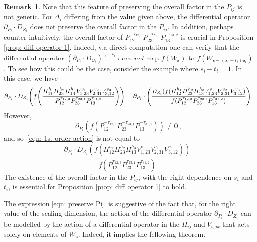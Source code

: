 \documentclass[12pt,a4paper]{extarticle}
\theoremstyle{definition}
\newtheorem{remark}[theorem]{Remark}
\begin{document}
\begin{remark}
Note that this feature of preserving the overall factor in the $P_{ij}$ is not generic. For $\Delta_i$ differing from the value given above, the differential operator $\partial_{P_i}\cdot D_{Z_i}$
does not preserve the overall factor in the $P_{ij}$. In addition, perhaps counter-intuitively, the overall factor of $P^{-\tau_{12,3}}_{12}P^{-\tau_{23,1}}_{23}P^{-\tau_{31,2}}_{13}$ is crucial in Proposition \ref{prop: diff operator 1}. Indeed, via direct computation one can verify that the differential operator $(\partial_{P_i}\cdot D_{Z_i})^{s_i-t_i}$ does \emph{not} map $f(W_{\mathbf{s}})$ to $f(W_{\mathbf{s}-(s_i-t_i)\mathbf{e}_i})$. To see how this could be the case, consider the example where $s_i-t_i=1$. In this case, we have
\begin{equation}\label{eqn: 1st order action}
    {\small\partial_{P_i}\cdot D_{Z_i}\Bigg(f\Bigg(\frac{H^{h_{1}}_{12}H^{h_{2}}_{23}H^{h_{3}}_{13}V^{v_1}_{1,23}V^{v_2}_{2,31}V^{v_3}_{3,12}}{P^{\tau_{12,3}}_{12}P^{\tau_{23,1}}_{23}P^{\tau_{31,2}}_{13}}\Bigg)\Bigg)=\partial_{P_i}\cdot\Bigg(\frac{D_{Z_i}(f(H^{h_{1}}_{12}H^{h_{2}}_{23}H^{h_{3}}_{13}V^{v_1}_{1,23}V^{v_2}_{2,31}V^{v_3}_{3,12})}{f(P^{\tau_{12,3}}_{12}P^{\tau_{23,1}}_{23}P^{\tau_{31,2}}_{13})}\Bigg).}
\end{equation}
However,
\begin{equation*}
    \partial_{P_i}(f(P^{-\tau_{12,3}}_{12}P^{-\tau_{23,1}}_{23}P^{-\tau_{31,2}}_{13}))\neq \mathbf{0}\,,
\end{equation*}
and so~\eqref{eqn: 1st order action} is not equal to
\begin{equation*}
    \frac{\partial_{P_i}\cdot D_{Z_i}(f(H^{h_{1}}_{12}H^{h_{2}}_{23}H^{h_{3}}_{13}V^{v_1}_{1,23}V^{v_2}_{2,31}V^{v_3}_{3,12}))}{f(P^{\tau_{12,3}}_{12}P^{\tau_{23,1}}_{23}P^{\tau_{31,2}}_{13})}\,.
\end{equation*}
The existence of the overall factor in the $P_{ij}$, with the right dependence on $s_i$ and $t_i$, is essential for Proposition \ref{prop: diff operator 1} to hold.
\end{remark}

The expression \eqref{eqn: preserve Pij} is suggestive of the fact that, for the right value of the scaling dimension, the action of the differential operator $\partial_{P_i}\cdot D_{Z_i}$
can be modelled by the action of a differential operator in the $H_{ij}$ and $V_{i,jk}$ that acts solely on elements of $W_{\mathbf{s}}$. Indeed, it implies the following theorem.
\end{document}
